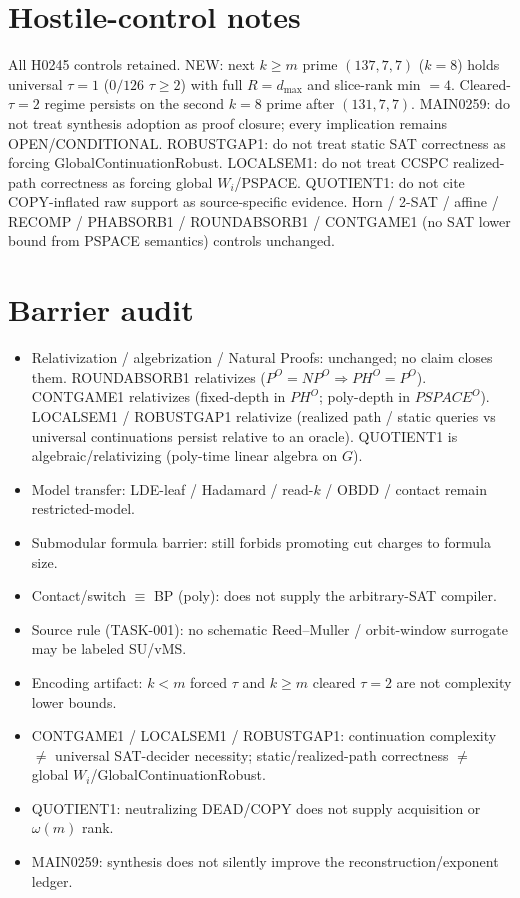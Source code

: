 \documentclass[11pt]{article}
\begin{document}
\section*{Hostile-control notes}
All H0245 controls retained. NEW: next $k{\ge}m$ prime $(137,7,7)$ ($k{=}8$) holds universal
$\tau{=}1$ ($0/126$ $\tau{\ge}2$) with full $R{=}d_{\max}$ and slice-rank min $=4$.
Cleared-$\tau{=}2$ regime persists on the second $k{=}8$ prime after $(131,7,7)$.
MAIN0259: do not treat synthesis adoption as proof closure; every implication remains OPEN/CONDITIONAL.
ROBUSTGAP1: do not treat static SAT correctness as forcing GlobalContinuationRobust.
LOCALSEM1: do not treat CCSPC realized-path correctness as forcing global $W_i$/PSPACE.
QUOTIENT1: do not cite COPY-inflated raw support as source-specific evidence. Horn / 2-SAT / affine /
RECOMP / PHABSORB1 / ROUNDABSORB1 / CONTGAME1 (no SAT lower bound from PSPACE semantics)
controls unchanged.

\section*{Barrier audit}
\begin{itemize}
\item Relativization / algebrization / Natural Proofs: unchanged; no claim closes them.
  ROUNDABSORB1 relativizes ($P^O{=}NP^O\Rightarrow PH^O{=}P^O$).
  CONTGAME1 relativizes (fixed-depth in $PH^O$; poly-depth in $PSPACE^O$).
  LOCALSEM1 / ROBUSTGAP1 relativize (realized path / static queries vs universal continuations
  persist relative to an oracle).
  QUOTIENT1 is algebraic/relativizing (poly-time linear algebra on $G$).
\item Model transfer: LDE-leaf / Hadamard / read-$k$ / OBDD / contact remain restricted-model.
\item Submodular formula barrier: still forbids promoting cut charges to formula size.
\item Contact/switch $\equiv$ BP (poly): does not supply the arbitrary-SAT compiler.
\item Source rule (TASK-001): no schematic Reed--Muller / orbit-window surrogate may be labeled SU/vMS.
\item Encoding artifact: $k{<}m$ forced $\tau$ and $k{\ge}m$ cleared $\tau{=}2$ are not complexity lower bounds.
\item CONTGAME1 / LOCALSEM1 / ROBUSTGAP1: continuation complexity $\neq$ universal SAT-decider necessity;
  static/realized-path correctness $\neq$ global $W_i$/GlobalContinuationRobust.
\item QUOTIENT1: neutralizing DEAD/COPY does not supply acquisition or $\omega(m)$ rank.
\item MAIN0259: synthesis does not silently improve the reconstruction/exponent ledger.
\end{itemize}
\end{document}
